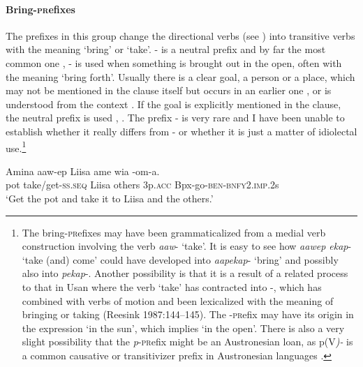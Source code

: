 \paragraph{Bring-\textsc{pr}efixes}\label{sec:3.8.2.4.2}
{}
The prefixes in this group change the directional verbs (see ) into transitive verbs with the meaning `bring' or `take'. \nobreakdash- is a neutral prefix and by far the most common one , \nobreakdash- is used when something is brought out in the open, often with the meaning `bring forth'. Usually there is a clear goal, a person or a place, which may not be mentioned in the clause itself but occurs in an earlier one , or is understood from the context . If the goal is explicitly mentioned in the clause, the neutral prefix is used , . The prefix \nobreakdash-  is very rare and I have been unable to establish whether it really differs from \nobreakdash- or whether it is just a matter of idiolectal use.\footnote{The bring\nobreakdash-\textsc{pr}efixes may have been grammaticalized from a medial verb construction involving the verb \textit{aaw}\nobreakdash- `take'. It is easy to see how \textit{aawep ekap}\nobreakdash- `take (and) come' could have developed into \textit{aapekap}\nobreakdash- `bring' and possibly also into \textit{pekap}-. Another possibility is that it is a result of a related process to that in Usan where the verb  `take' has contracted into \nobreakdash-, which has combined with verbs of motion and been lexicalized with the meaning of bringing or taking ({Reesink 1987}:144--145). The \nobreakdash-\textsc{pr}efix may have its origin in the expression  `in the sun', which implies `in the open'. There is also a very slight possibility that the \textit{p}\nobreakdash-\textsc{pr}efix might be an Austronesian loan, as p(V\textit{)\nobreakdash-} is a common causative or transitivizer prefix in Austronesian languages \citep[61]{Bugenhagen1995}. }

\ea%
\label{ex:3:x221}
\gll Amina aaw-ep Liisa ame wia -om-a.\\
pot take/get-\textsc{ss}.\textsc{seq} Liisa others 3p.\textsc{acc} Bpx-go-\textsc{ben}-\textsc{bnfy}2.\textsc{imp}.2s\\
\glt`Get the pot and take it to Liisa and the others.' 
\z

